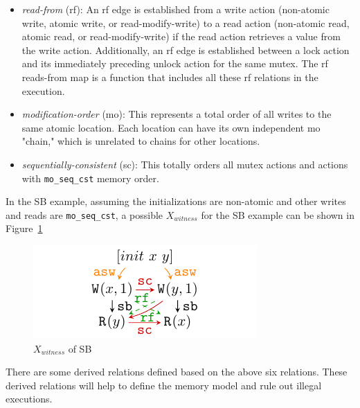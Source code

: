 

\begin{itemize}
	\item \textit{read-from} (rf): An rf edge is established from a write action (non-atomic write, atomic write, or read-modify-write) to a read action (non-atomic read, atomic read, or read-modify-write) if the read action retrieves a value from the write action. Additionally, an rf edge is established between a lock action and its immediately preceding unlock action for the same mutex. The rf reads-from map is a function that includes all these rf relations in the execution.
	\item \textit{modification-order} (mo): This represents a total order of all writes to the same atomic location. Each location can have its own independent mo "chain," which is unrelated to chains for other locations.
	\item \textit{sequentially-consistent} (sc): This totally orders all mutex actions and actions with \texttt{mo\_seq\_cst} memory order.
\end{itemize}


In the SB example, assuming the initializations are non-atomic and other writes and reads are \texttt{mo\_seq\_cst}, a possible $X_{witness}$ for the SB example can be shown in Figure~\ref{XwitnessSB}

\begin{figure}[htbp] %
	\centering
	\includegraphics[scale=1.3]{figure/exec-graph/SB2.pdf} %
	\caption{$X_{witness}$ of SB} %
	\label{XwitnessSB} %
\end{figure}

There are some derived relations defined based on the above six relations. These derived relations will help to define the memory model and rule out illegal executions.

